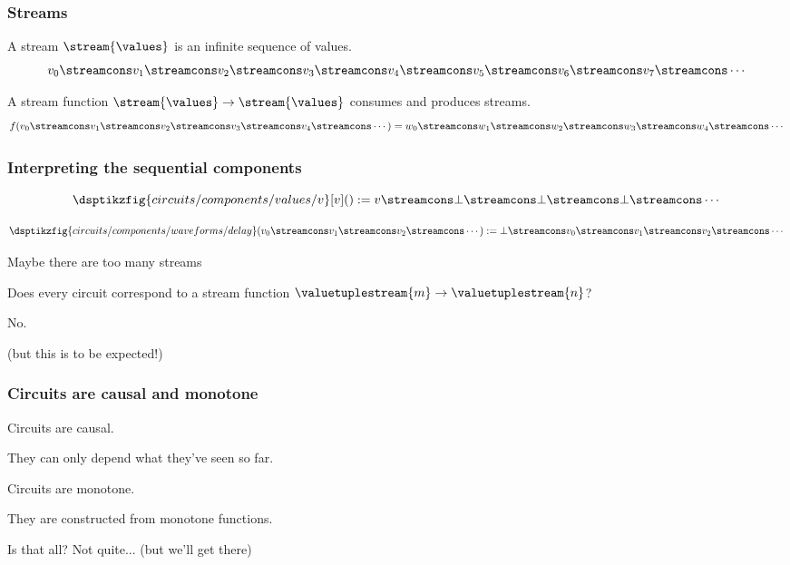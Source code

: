 \begin{frame}
    \frametitle{Streams}

    A \alert{stream} \(\stream{\values}\) is an infinite sequence of values.
    \[
        v_0
        \streamcons
        v_1
        \streamcons
        v_2
        \streamcons
        v_3
        \streamcons
        v_4
        \streamcons
        v_5
        \streamcons
        v_6
        \streamcons
        v_7
        \streamcons
        \cdots
    \]

    \pause
    A \alert{stream function} \(\stream{\values} \to \stream{\values}\) consumes and
    produces streams.
    \[
        f(
            v_0
            \streamcons
            v_1
            \streamcons
            v_2
            \streamcons
            v_3
            \streamcons
            v_4
            \streamcons
            \cdots
        ) =
        w_0
        \streamcons
        w_1
        \streamcons
        w_2
        \streamcons
        w_3
        \streamcons
        w_4
        \streamcons
        \cdots
    \]
\end{frame}
\begin{frame}
    \frametitle{Interpreting the sequential components}
    \pause
    \[
        \dsptikzfig{circuits/components/values/v}[v]()
        :=
        v \streamcons \bot \streamcons \bot \streamcons \bot \streamcons \cdots
    \]

    \pause
    \vspace{1em}

    \[
        \dsptikzfig{circuits/components/waveforms/delay}(
            v_0 \streamcons v_1 \streamcons v_2 \streamcons \cdots
        )
        :=
        \bot \streamcons v_0 \streamcons v_1 \streamcons v_2 \streamcons \cdots
    \]
\end{frame}
\begin{frame}{Maybe there are too many streams}

    \centering
    \LARGE
    Does every circuit correspond to a stream function \(
        \valuetuplestream{m} \to \valuetuplestream{n}
    \)?

    \Huge
    \pause
    No.

    \scriptsize
    \pause
    (but this is to be expected!)
\end{frame}
\begin{frame}
    \frametitle{Circuits are causal and monotone}

    \pause
    \Large
    Circuits are \alert{causal}.

    \pause

    \normalsize
    They can only depend \alert{what they've seen so far}.

    \pause

    \Large
    Circuits are \alert{monotone}.

    \pause

    \normalsize
    They are constructed from \alert{monotone functions}.

    \pause

    Is that all?
    \pause
    \alert{Not quite...}
    \pause
    (but we'll get there)


\end{frame}
